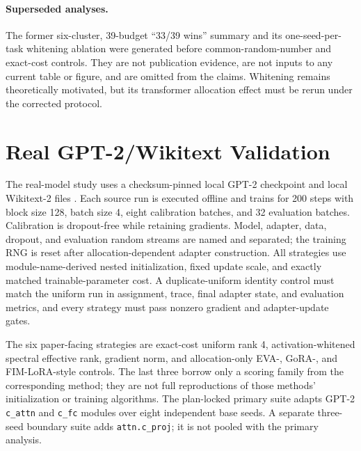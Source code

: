 \documentclass[10pt,twocolumn]{article}
\theoremstyle{definition}
\begin{document}
\paragraph{Superseded analyses.}
The former six-cluster, 39-budget ``33/39 wins'' summary and its one-seed-per-task whitening ablation were generated before common-random-number and exact-cost controls.  They are not publication evidence, are not inputs to any current table or figure, and are omitted from the claims.  Whitening remains theoretically motivated, but its transformer allocation effect must be rerun under the corrected protocol.

\FloatBarrier


\section{Real GPT-2/Wikitext Validation}
\label{sec:real-gpt2}

The real-model study uses a checksum-pinned local GPT-2 checkpoint and local Wikitext-2 files \cite{radford2019language,merity2016pointer}.  Each source run is executed offline and trains for 200 steps with block size 128, batch size 4, eight calibration batches, and 32 evaluation batches.  Calibration is dropout-free while retaining gradients.  Model, adapter, data, dropout, and evaluation random streams are named and separated; the training RNG is reset after allocation-dependent adapter construction.  All strategies use module-name-derived nested initialization, fixed update scale, and exactly matched trainable-parameter cost.  A duplicate-uniform identity control must match the uniform run in assignment, trace, final adapter state, and evaluation metrics, and every strategy must pass nonzero gradient and adapter-update gates.

The six paper-facing strategies are exact-cost uniform rank 4, activation-whitened spectral effective rank, gradient norm, and allocation-only EVA-, GoRA-, and FIM-LoRA-style controls.  The last three borrow only a scoring family from the corresponding method; they are not full reproductions of those methods' initialization or training algorithms.  The plan-locked primary suite adapts GPT-2 \texttt{c\_attn} and \texttt{c\_fc} modules over eight independent base seeds.  A separate three-seed boundary suite adds \texttt{attn.c\_proj}; it is not pooled with the primary analysis.
\end{document}
